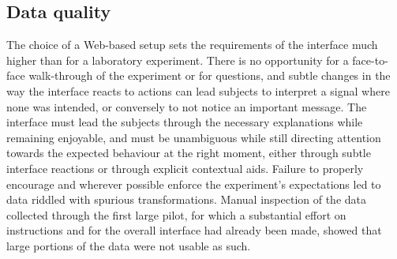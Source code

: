 \documentclass[a4paper,fleqn]{cas-dc}
\begin{document}
\subsection{Data quality}\label{data-quality}

The choice of a Web-based setup sets the requirements of the interface
much higher than for a laboratory experiment. There is no opportunity
for a face-to-face walk-through of the experiment or for questions, and
subtle changes in the way the interface reacts to actions can lead
subjects to interpret a signal where none was intended, or conversely to
not notice an important message.
The interface must lead the subjects through the
necessary explanations while remaining enjoyable, and must be
unambiguous while still directing attention towards the expected behaviour at the
right moment, either through subtle interface reactions or through
explicit contextual aids.
Failure to properly encourage and wherever possible enforce the
experiment's expectations led to data riddled with spurious
transformations. Manual inspection of the data collected through the first large pilot, for which a substantial effort on instructions and for the
overall interface had already been made, showed that large portions of
the data were not usable as such.
\end{document}
